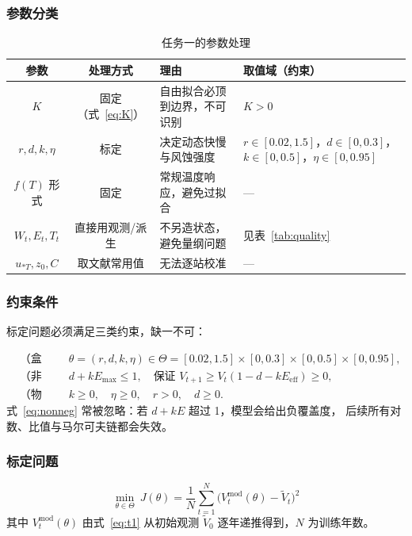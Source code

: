 \documentclass[11pt,a4paper]{ctexart}
\begin{document}
\subsubsection{参数分类}

\begin{table}[H]\centering\small
\begin{tabularx}{\textwidth}{|c|c|X|X|}
\toprule
参数 & 处理方式 & 理由 & 取值域（约束） \\
\midrule
$K$ & 固定（式~\eqref{eq:K}） & 自由拟合必顶到边界，不可识别 & $K>0$ \\
$r,d,k,\eta$ & 标定 & 决定动态快慢与风蚀强度 & $r\in[0.02,1.5]$，$d\in[0,0.3]$，
$k\in[0,0.5]$，$\eta\in[0,0.95]$ \\
$f(T)$ 形式 & 固定 & 常规温度响应，避免过拟合 & — \\
$W_t,E_t,T_t$ & 直接用观测/派生 & 不另造状态，避免量纲问题 & 见表~\ref{tab:quality} \\
$u_{*T},z_0,C$ & 取文献常用值 & 无法逐站校准 & — \\
\bottomrule
\end{tabularx}
\caption{任务一的参数处理}\label{tab:t1par}
\end{table}

\subsubsection{约束条件}

标定问题必须满足三类约束，缺一不可：

\begin{align}
&\text{（盒约束）} && \theta=(r,d,k,\eta)\in\Theta=[0.02,1.5]\times[0,0.3]\times[0,0.5]\times[0,0.95],\label{eq:box}\\
&\text{（非负性）} && d+kE_{\max}\le 1,\quad\text{保证 }V_{t+1}\ge V_t(1-d-kE_{\mathrm{eff}})\ge0,\label{eq:nonneg}\\
&\text{（物理符号）} && k\ge0,\quad \eta\ge0,\quad r>0,\quad d\ge0.\label{eq:sign}
\end{align}
式~\eqref{eq:nonneg} 常被忽略：若 $d+kE$ 超过 1，模型会给出负覆盖度，
后续所有对数、比值与马尔可夫链都会失效。

\subsubsection{标定问题}

\begin{equation}\label{eq:obj}
\min_{\theta\in\Theta}\ J(\theta)=\frac{1}{N}\sum_{t=1}^{N}\Big(V_t^{\mathrm{mod}}(\theta)-\tilde V_t\Big)^2
\end{equation}
其中 $V_t^{\mathrm{mod}}(\theta)$ 由式~\eqref{eq:t1} 从初始观测 $\tilde V_0$ 逐年递推得到，$N$ 为训练年数。
\end{document}
